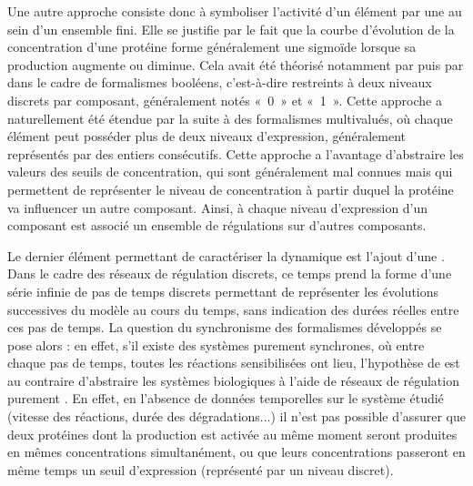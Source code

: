 Une autre approche consiste donc à symboliser l'activité d'un élément par
une  au sein d'un ensemble fini.
Elle se justifie par le fait que la courbe d'évolution de la concentration
d'une protéine forme généralement une sigmoïde lorsque sa production augmente ou diminue.
Cela avait été théorisé notamment par 
puis par 
dans le cadre de formalismes booléens,
c'est-à-dire restreints à deux niveaux discrets par composant, généralement notés
«~0~» et «~1~».
Cette approche a naturellement été étendue par la suite à des formalismes multivalués,
où chaque élément peut posséder plus de deux niveaux d'expression,
généralement représentés par des entiers consécutifs.
Cette approche a l'avantage d'abstraire les valeurs des seuils de concentration,
qui sont généralement mal connues
mais qui permettent de représenter le niveau de concentration
à partir duquel la protéine va influencer un autre composant.
Ainsi, à chaque niveau d'expression d'un composant est associé un ensemble de régulations
sur d'autres composants.

Le dernier élément permettant de caractériser la dynamique est l'ajout d'une
.
Dans le cadre des réseaux de régulation discrets, ce temps prend la forme d'une série
infinie de pas de temps discrets permettant de représenter les évolutions
successives du modèle au cours du temps, sans indication des durées réelles
entre ces pas de temps.
La question du synchronisme des formalismes développés se pose alors :
en effet, s'il existe des systèmes purement synchrones, où entre chaque pas de temps,
toutes les réactions sensibilisées ont lieu,
l'hypothèse de 
est au contraire d'abstraire les systèmes biologiques à l'aide
de réseaux de régulation purement .
En effet, en l'absence de données temporelles sur le système étudié
(vitesse des réactions, durée des dégradations...)
il n'est pas possible d'assurer que deux protéines dont la production est activée au même moment
seront produites en mêmes concentrations simultanément,
ou que leurs concentrations passeront en même temps
un seuil d'expression (représenté par un niveau discret).

